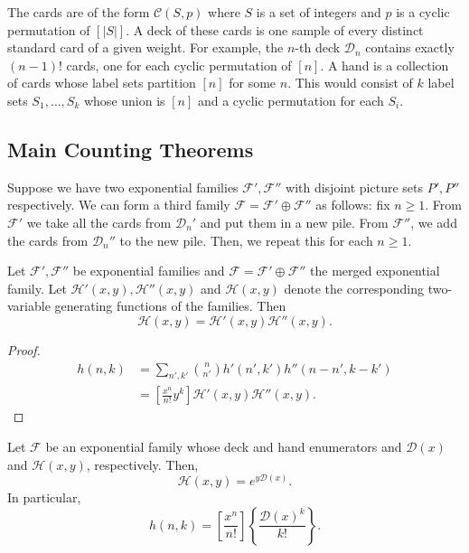 \documentclass[11pt]{article}
\renewcommand{\>}{\rangle}
\newcommand{\<}{\langle}
\let \mc \mathcal
\begin{document}
\begin{example}[Permutations $\mc F_2$] The cards are of the form $\mc C(S, p)$ where $S$ is a set of integers and $p$ is a cyclic permutation of $[|S|]$.  A deck of these cards is one sample of every distinct standard card of a given weight.  For example, the $n$-th deck $\mc D_n$ contains exactly $(n-1)!$ cards, one for each cyclic permutation of $[n]$.  A hand is a collection of cards whose label sets partition $[n]$ for some $n$. This would consist of $k$ label sets $S_1, \dots, S_k$ whose union is $[n]$ and a cyclic permutation for each $S_i$.
\end{example}

\subsection{Main Counting Theorems}
Suppose we have two exponential families $\mc F', \mc F''$ with disjoint picture sets $P', P''$ respectively.  We can form a third family $\mc F = \mc F' \oplus \mc F''$ as follows:  fix $n \ge 1$.  From $\mc F'$ we take all the cards from $\mc D_n'$ and put them in a new pile.  From $\mc F''$, we add the cards from $\mc D_n''$ to the new pile.  Then, we repeat this for each $n \ge 1$.

\begin{lemma}
Let $\mc F', \mc F''$ be exponential families and $\mc F = \mc F' \oplus \mc F''$ the merged exponential family.  Let $\mc H'(x, y), \mc H''(x, y)$ and $\mc H(x, y)$ denote the corresponding two-variable generating functions of the families.  Then
$$\mc H(x, y) = \mc H'(x, y)\mc H''(x, y).$$
\end{lemma}
\begin{proof}
\begin{align*}
h(n, k) &= \sum_{n', k'} \binom{n}{n'} h'(n', k') h''(n-n', k-k') \\
&= \left[\frac{x^n}{n!} y^k \right]\mc H'(x, y) \mc H''(x, y).
\end{align*}
\end{proof}

\begin{theorem}
Let $\mc F$ be an exponential family whose deck and hand enumerators and $\mc D(x)$ and $\mc H(x, y)$, respectively.  Then, 
$$\mc H(x, y) = e^{y\mc D(x)}.$$
In particular, 
$$h(n, k) = \left[\frac{x^n}{n!} \right] \left\{ \frac{\mc D(x)^k}{k!} \right\}.$$
\end{theorem}
\end{document}
